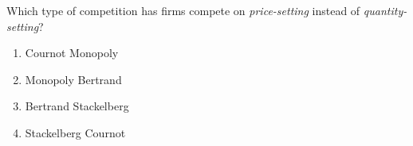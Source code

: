 \begin{question}[type=exam]{3}
  Which type of competition has firms compete on \textit{price-setting}
  instead of \textit{quantity-setting}?
  \begin{enumerate}[label=\alph*), noitemsep]
    \item \vary
      {Cournot}
      {Monopoly}
    \item \vary
      {Monopoly}
      {Bertrand} %
    \item \vary
      {Bertrand} %
      {Stackelberg}
    \item \vary
      {Stackelberg}
      {Cournot}
  \end{enumerate}
\end{question}

